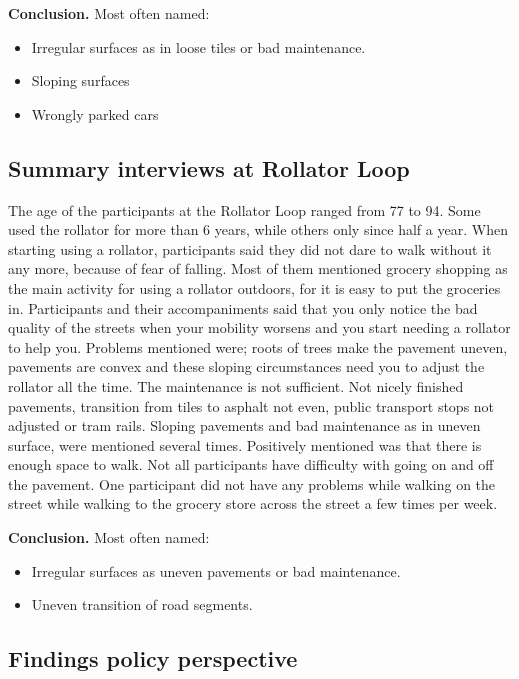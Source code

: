\textbf{Conclusion.} Most often named: 
\begin{itemize}
\item Irregular surfaces as in loose tiles or bad maintenance. 
\item Sloping surfaces
\item Wrongly parked cars
\end{itemize}


\subsection{Summary interviews at Rollator Loop}
The age of the participants at the Rollator Loop ranged from 77 to 94. Some used the rollator for more than 6 years, while others only since half a year. When starting using a rollator, participants said they did not dare to walk without it any more, because of fear of falling. Most of them mentioned grocery shopping as the main activity for using a rollator outdoors, for it is easy to put the groceries in. 
Participants and their accompaniments said that you only notice the bad quality of the streets when your mobility worsens and you start needing a rollator to help you. Problems mentioned were; roots of trees make the pavement uneven, pavements are convex and these sloping circumstances need you to adjust the rollator all the time. The maintenance is not sufficient. Not nicely finished pavements, transition from tiles to asphalt not even, public transport stops not adjusted or tram rails. Sloping pavements and bad maintenance as in uneven surface, were mentioned several times. Positively mentioned was that there is enough space to walk. Not all participants have difficulty with going on and off the pavement. One participant did not have any problems while walking on the street while walking to the grocery store across the street a few times per week. 

\textbf{Conclusion.} Most often named: 
\begin{itemize}
\item Irregular surfaces as uneven pavements or bad maintenance. 
\item Uneven transition of road segments.
\end{itemize}


\subsection{Findings policy perspective}

